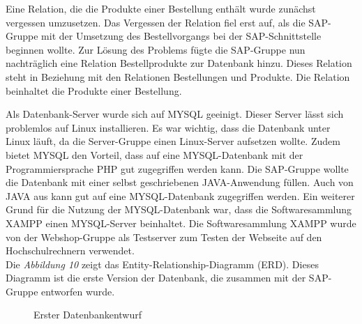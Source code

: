 Eine Relation, die die Produkte einer Bestellung enthält wurde zunächst vergessen umzusetzen. Das Vergessen der Relation fiel erst auf, als die SAP-Gruppe mit der Umsetzung des Bestellvorgangs bei der SAP-Schnittstelle beginnen wollte. Zur Lösung des Problems fügte die SAP-Gruppe nun nachträglich eine Relation \glqq Bestellprodukte\grqq{} zur Datenbank hinzu. Dieses Relation steht in Beziehung mit den Relationen \glqq Bestellungen\grqq{} und \glqq Produkte\grqq{}. Die Relation beinhaltet die Produkte einer Bestellung.

Als Datenbank-Server wurde sich auf MYSQL geeinigt. Dieser Server lässt sich problemlos auf Linux installieren. Es war wichtig, dass die Datenbank unter Linux läuft, da die Server-Gruppe einen Linux-Server aufsetzen wollte. Zudem bietet MYSQL den Vorteil, dass auf eine MYSQL-Datenbank mit der Programmiersprache PHP gut zugegriffen werden kann. Die SAP-Gruppe wollte die Datenbank mit einer selbst geschriebenen JAVA-Anwendung füllen. Auch von JAVA aus kann gut auf eine MYSQL-Datenbank zugegriffen werden. Ein weiterer Grund für die Nutzung der MYSQL-Datenbank war, dass die Softwaresammlung XAMPP einen MYSQL-Server beinhaltet. Die Softwaresammlung XAMPP wurde von der Webshop-Gruppe als Testserver zum Testen der Webseite auf den Hochschulrechnern verwendet. \\
Die \textit{Abbildung 10} zeigt das \glqq Entity-Relationship-Diagramm (ERD)\grqq{}. Dieses Diagramm ist die erste Version der Datenbank, die zusammen mit der SAP-Gruppe entworfen wurde. 

\begin{figure}[H]
	\begin{center}
	\end{center}
	\caption{Erster Datenbankentwurf}
	\label{fig:Abbildung 10}
\end{figure}

